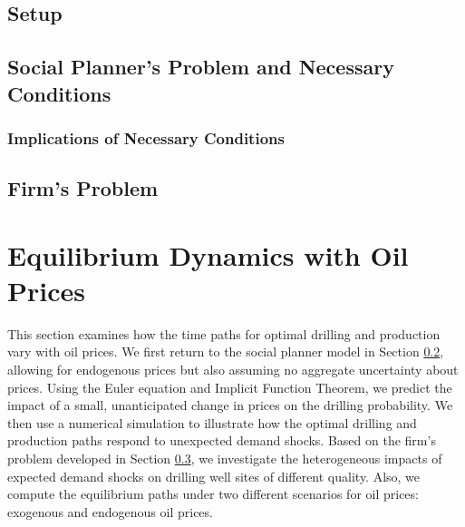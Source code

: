 \subsection{Setup}
\label{C3-SubSection:Setup}


\subsection{Social Planner's Problem and Necessary Conditions}
\label{C3-SubSection:Social-Planners-Problem-and-Necessary-Conditions}


\subsubsection{Implications of Necessary Conditions}
\label{C3-SubSubSection:Necessary-Conditions}


\subsection{Firm's Problem}
\label{C3-SubSection:Firms-Problem}




\section{Equilibrium Dynamics with Oil Prices}
\label{C3-Section:Equilibrium-Dynamics-with-Oil-Prices}
This section examines how the time paths for optimal drilling and production vary with oil prices. We first return to the social planner model in Section \ref{C3-SubSection:Social-Planners-Problem-and-Necessary-Conditions}, allowing for endogenous prices but also assuming no aggregate uncertainty about prices. Using the Euler equation and Implicit Function Theorem, we predict the impact of a small, unanticipated change in prices on the drilling probability. We then use a numerical simulation to illustrate how the optimal drilling and production paths respond to unexpected demand shocks. Based on the firm's problem developed in Section \ref{C3-SubSection:Firms-Problem}, we investigate the heterogeneous impacts of expected demand shocks on drilling well sites of different quality. Also, we compute the equilibrium paths under two different scenarios for oil prices: exogenous and endogenous oil prices. 


